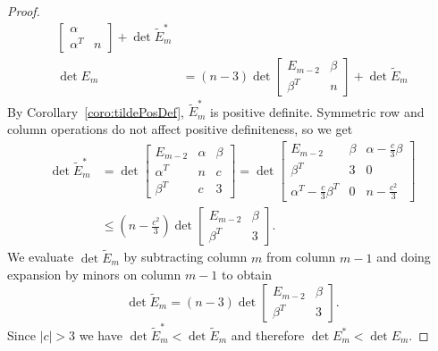 \documentclass[11pt,a4paper]{article}
\begin{document}
\begin{proof}
\begin{align*}
\begin{bmatrix}
\alpha\\\alpha^T & n\end{bmatrix}+\det\tilde E_m^*\\
\det E_m&=(n-3)\det\begin{bmatrix}E_{m-2} & 
\beta\\\beta^T & n\end{bmatrix}+\det\tilde E_m
\end{align*}
By Corollary~\ref{coro:tildePosDef}, $\tilde E_m^*$ is positive definite. 
Symmetric row and column operations do not affect positive definiteness, so
we get
\renewcommand{\arraystretch}{1.2}
\begin{align*}
\det\tilde E_m^*&=\det\begin{bmatrix}E_{m-2} & \alpha & \beta\\\alpha^T & n & c\\\beta^T & c & 3\end{bmatrix}=\det\begin{bmatrix}E_{m-2} & \beta & \alpha-\frac{c}{3}\beta\\
\beta^T & 3 & 0\\
\alpha^T-\frac{c}{3}\beta^T & 0 & n-\frac{c^2}{3}\end{bmatrix}\\
&\le \left(n-\frac{c^2}{3}\right)\det\begin{bmatrix}E_{m-2} & 
\beta\\\beta^T & 3\end{bmatrix}.
\end{align*}
\renewcommand{\arraystretch}{1}
We evaluate $\det\tilde E_m$ by subtracting column $m$ from column $m-1$ and
doing expansion by minors on column $m-1$ to obtain
\begin{equation*}
\det\tilde E_m=(n-3)\det\begin{bmatrix}E_{m-2} & \beta\\\beta^T & 
3\end{bmatrix}.
\end{equation*}
Since $|c|>3$ we have $\det\tilde E_m^*<\det\tilde E_m$ and therefore $\det
E_m^*<\det E_m$.
\end{proof}
\end{document}
